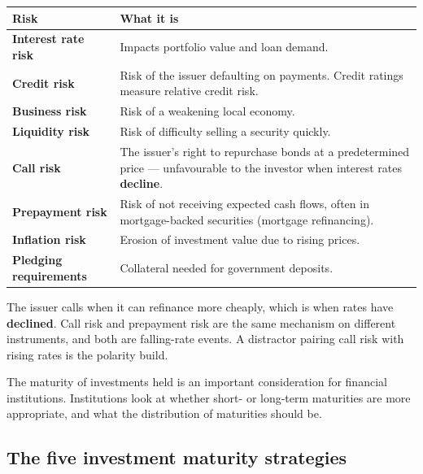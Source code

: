 \begin{center}
\small
\begin{tabularx}{\textwidth}{@{}p{3.5cm} X@{}}
\toprule
\rowcolor{FRMSoft}\textbf{Risk} & \textbf{What it is} \\
\midrule
\textbf{Interest rate risk} & Impacts portfolio value and loan demand. \\
\textbf{Credit risk} & Risk of the issuer defaulting on payments. Credit ratings measure relative credit risk. \\
\textbf{Business risk} & Risk of a weakening local economy. \\
\textbf{Liquidity risk} & Risk of difficulty selling a security quickly. \\
\textbf{Call risk} & The issuer's right to repurchase bonds at a predetermined price — unfavourable to the investor when interest rates \textbf{decline}. \\
\textbf{Prepayment risk} & Risk of not receiving expected cash flows, often in mortgage-backed securities (mortgage refinancing). \\
\textbf{Inflation risk} & Erosion of investment value due to rising prices. \\
\textbf{Pledging requirements} & Collateral needed for government deposits. \\
\bottomrule
\end{tabularx}
\end{center}

\begin{lrtrapbox}
The issuer calls when it can refinance more cheaply, which is when rates have \textbf{declined}. Call risk and prepayment risk are the same mechanism on different instruments, and both are falling-rate events. A distractor pairing call risk with rising rates is the polarity build.
\end{lrtrapbox}


The maturity of investments held is an important consideration for financial institutions. Institutions look at whether short- or long-term maturities are more appropriate, and what the distribution of maturities should be.

\subsection{The five investment maturity strategies}

